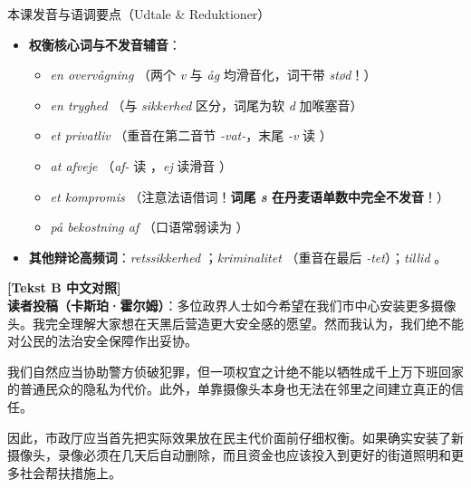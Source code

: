 \begin{tipbox}{本课发音与语调要点（Udtale \& Reduktioner）}
\begin{itemize}
  \item \textbf{权衡核心词与不发音辅音}：
    \begin{itemize}
      \item \textit{en overvågning} （两个 \textit{v} 与 \textit{åg} 均滑音化，词干带 \textit{stød}！）
      \item \textit{en tryghed} （与 \textit{sikkerhed} 区分，词尾为软 \textit{d} 加喉塞音）
      \item \textit{et privatliv} （重音在第二音节 \textit{-vat-}，末尾 \textit{-v} 读 ）
      \item \textit{at afveje} （\textit{af-} 读 ，\textit{ej} 读滑音 ）
      \item \textit{et kompromis} （注意法语借词！\textbf{词尾 \textit{s} 在丹麦语单数中完全不发音}！）
      \item \textit{på bekostning af} （口语常弱读为 ）
    \end{itemize}
  \item \textbf{其他辩论高频词}：\textit{retssikkerhed} ；\textit{kriminalitet} （重音在最后 \textit{-tet}）；\textit{tillid} 。
\end{itemize}
\end{tipbox}

\begin{transbox}
\small
\textbf{\color{NCDTeal}[Tekst B 中文对照]}\\
\textbf{读者投稿（卡斯珀·霍尔姆）}：多位政界人士如今希望在我们市中心安装更多摄像头。我完全理解大家想在天黑后营造更大安全感的愿望。然而我认为，我们绝不能对公民的法治安全保障作出妥协。

我们自然应当协助警方侦破犯罪，但一项权宜之计绝不能以牺牲成千上万下班回家的普通民众的隐私为代价。此外，单靠摄像头本身也无法在邻里之间建立真正的信任。

因此，市政厅应当首先把实际效果放在民主代价面前仔细权衡。如果确实安装了新摄像头，录像必须在几天后自动删除，而且资金也应该投入到更好的街道照明和更多社会帮扶措施上。
\end{transbox}


